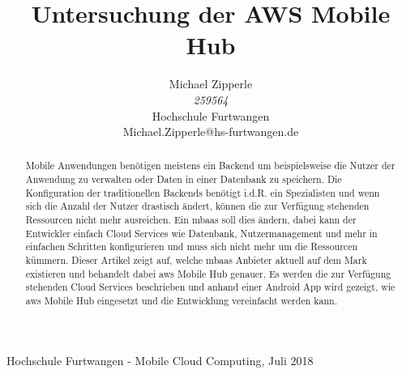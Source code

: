 \documentclass[journal]{IEEEtran}
\begin{document}
\title{Untersuchung der AWS Mobile Hub}

\author{\begin{center}
 Michael Zipperle \\ 
 \textit{259564} \\
 Hochschule Furtwangen \\
 Michael.Zipperle@hs-furtwangen.de \\
\end{center}}%
        
%
{Hochschule Furtwangen - Mobile Cloud Computing, Juli 2018}

\maketitle


\begin{abstract}
Mobile Anwendungen benötigen meistens ein Backend um beispielsweise die Nutzer der Anwendung zu verwalten oder Daten in einer Datenbank zu speichern. Die Konfiguration der traditionellen Backends benötigt i.d.R. ein Spezialisten und wenn sich die Anzahl der Nutzer drastisch ändert, können die zur Verfügung stehenden Ressourcen nicht mehr ausreichen. Ein \gls{mbaas} soll dies ändern, dabei kann der Entwickler einfach Cloud Services wie Datenbank, Nutzermanagement und mehr in einfachen Schritten konfigurieren und muss sich nicht mehr um die Ressourcen kümmern. Dieser Artikel zeigt auf, welche \gls{mbaas} Anbieter aktuell auf dem Mark existieren und behandelt dabei \gls{aws} Mobile Hub genauer. Es werden die zur Verfügung stehenden Cloud Services beschrieben und anhand einer Android App wird gezeigt, wie \gls{aws} Mobile Hub eingesetzt und die Entwicklung vereinfacht werden kann.

\end{abstract}


\IEEEpeerreviewmaketitle


\end{document}
